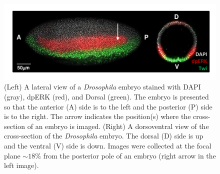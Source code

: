 \documentclass{pnastwo}
\begin{document}
\begin{figure}
\includegraphics{figS1}
\caption{(Left) A lateral view of a {\it Drosophila} embryo stained with DAPI (gray), dpERK (red), and Dorsal (green). The embryo is presented so that the anterior (A) side is to the left and the posterior (P) side is to the right. The arrow indicates the position(s) where the cross-section of an embryo is imaged. (Right) A dorsoventral view of the cross-section of the {\it Drosophila} embryo. The dorsal (D) side is up and the ventral (V) side is down. Images were collected at the focal plane $\sim 18\%$ from the posterior pole of an embryo (right arrow in the left image). }
\label{fig:ap_dv}
\end{figure}
\end{document}
